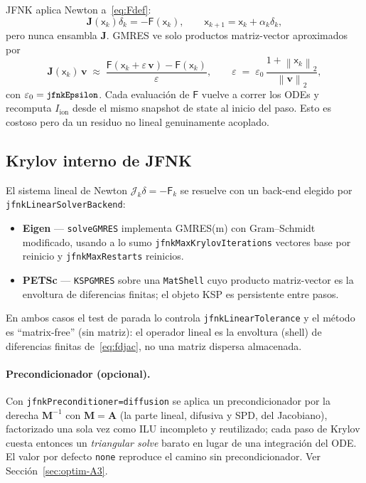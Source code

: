 \documentclass[11pt,a4paper]{article}
\newcommand{\code}[1]{\texttt{\small #1}}
\newcommand{\Iion}{I_{\mathrm{ion}}}
\newcommand{\Aimp}{\mathbf{A}}
\newcommand{\Fres}{\mathsf{F}}
\newcommand{\norm}[1]{\left\lVert #1 \right\rVert}
\begin{document}
JFNK aplica Newton a~\eqref{eq:Fdef}:
\[
  \mathbf{J}(\mathsf{x}_k)\delta_k
  =
  -\Fres(\mathsf{x}_k),
  \qquad
  \mathsf{x}_{k+1}=\mathsf{x}_k+\alpha_k\delta_k,
\]
pero nunca ensambla $\mathbf{J}$. GMRES ve solo productos matriz-vector aproximados
por
\begin{equation}
  \mathbf{J}(\mathsf{x}_{k})\, \mathbf{v}
   \;\approx\;
   \frac{\Fres(\mathsf{x}_{k} + \varepsilon\, \mathbf{v})
         - \Fres(\mathsf{x}_{k})}{\varepsilon},
   \qquad
   \varepsilon \;=\; \varepsilon_{0}\,
                     \frac{1 + \norm{\mathsf{x}_{k}}_{2}}
                          {\norm{\mathbf{v}}_{2}},
   \label{eq:fdjac}
\end{equation}
con $\varepsilon_{0}=\code{jfnkEpsilon}$. Cada evaluación de $\Fres$ vuelve a
correr los ODEs y recomputa $\Iion$ desde el mismo snapshot de state al inicio del
paso. Esto es costoso pero da un residuo no lineal genuinamente acoplado.

\subsection{Krylov interno de JFNK}
\label{sec:jfnk-krylov}

El sistema lineal de Newton $\mathcal{J}_k\delta=-\Fres_k$ se
resuelve con un back-end elegido por \code{jfnkLinearSolverBackend}:
\begin{itemize}[nosep]
\item \textbf{Eigen} --- \code{solveGMRES} implementa GMRES(m) con Gram--Schmidt
  modificado, usando a lo sumo \code{jfnkMaxKrylovIterations} vectores base por
  reinicio y \code{jfnkMaxRestarts} reinicios.
\item \textbf{PETSc} --- \code{KSPGMRES} sobre una \code{MatShell} cuyo producto
  matriz-vector es la envoltura de diferencias finitas; el objeto KSP es
  persistente entre pasos.
\end{itemize}
En ambos casos el test de parada lo controla \code{jfnkLinearTolerance} y el método
es ``matrix-free'' (sin matriz): el operador lineal es la envoltura (shell) de
diferencias finitas de~\eqref{eq:fdjac}, no una matriz dispersa almacenada.

\paragraph{Precondicionador (opcional).}
Con \code{jfnkPreconditioner=diffusion} se aplica un precondicionador por la derecha
$\mathbf{M}^{-1}$ con $\mathbf{M}=\Aimp$ (la parte lineal, difusiva y SPD, del
Jacobiano), factorizado una sola vez como ILU incompleto y reutilizado; cada paso de
Krylov cuesta entonces un \emph{triangular solve} barato en lugar de una integración
del ODE. El valor por defecto \code{none} reproduce el camino sin precondicionador.
Ver Sección~\ref{sec:optim-A3}.
\end{document}
